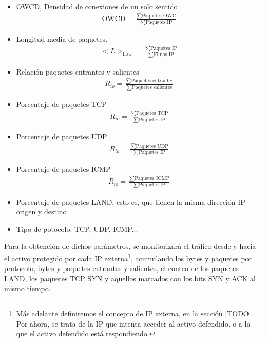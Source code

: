 \begin{itemize}
 \item \gls{OWCD}, Densidad de conexiones de un solo sentido
 \begin{align}
  \text{OWCD} = \frac{\sum\text{Paquetes OWC}}{\sum\text{Paquetes IP}}
 \end{align}

 \item Longitud media de paquetes.
 \begin{align}
  <L>_{\text{flow}} = \frac{\sum\text{Paquetes IP}}{\sum\text{Flujos IP}}
 \end{align}
 
 \item Relación paquetes entrantes y salientes
 \begin{align}
  R_{io} = \frac{\sum\text{Paquetes entrantes}}{\sum\text{Paquetes salientes}}
 \end{align}
 
 \item Porcentaje de paquetes TCP
 \begin{align}
  R_{io} = \frac{\sum\text{Paquetes TCP}}{\sum\text{Paquetes IP}}
 \end{align}
 
 \item Porcentaje de paquetes UDP
 \begin{align}
  R_{io} = \frac{\sum\text{Paquetes UDP}}{\sum\text{Paquetes IP}}
 \end{align}
 
 \item Porcentaje de paquetes ICMP
 \begin{align}
  R_{io} = \frac{\sum\text{Paquetes ICMP}}{\sum\text{Paquetes IP}}
 \end{align}
 
 \item Porcentaje de paquetes LAND, esto es, que tienen la misma dirección IP origen y destino
 \item Tipo de potocolo: \gls{TCP}, \gls{UDP}, \gls{ICMP}... 
\end{itemize}

Para la obtención de dichos parámetros, se monitorizará el tráfico desde y hacia el activo protegido por cada IP 
externa\footnote{Más adelante definiremos el concepto de \gls{IP} externa, en la sección \ref{TODO}. Por ahora, se 
trata de la \gls{IP} que intenta acceder al activo defendido, o a la que el activo defendido está respondiendo.}, 
acumulando los bytes y paquetes por protocolo, bytes y paquetes entrantes y salientes, el conteo de los paquetes LAND, 
los paquetes \gls{TCP} \gls{SYN} y aquellos marcados con los bits \gls{SYN} y \gls{ACK} al mismo tiempo. 


